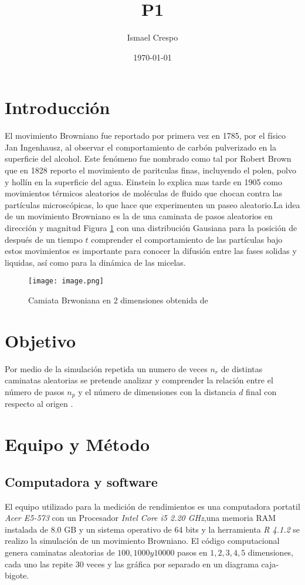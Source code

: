 \documentclass{article}
\title{P1}
\author{Ismael Crespo}
\date{\today}
\begin{document}
\maketitle

\section{Introducción}
El movimiento Browniano fue reportado por primera vez en 1785, por el físico Jan Ingenhausz, al observar el comportamiento de carbón pulverizado en la superficie del alcohol. Este fenómeno fue nombrado como tal por Robert Brown que en 1828 reporto el movimiento de paritculas finas, incluyendo el polen, polvo y hollín en la superficie del agua. Einstein lo explica mas tarde en 1905 como movimientos térmicos aleatorios de moléculas de fluido que chocan contra las partículas microscópicas, lo que hace que experimenten un paseo aleatorio.La idea de un movimiento Browniano es la de una caminata de pasos aleatorios en dirección y magnitud Figura \ref{BM} con una distribución Gausiana para la posición de después de un tiempo $t$ comprender el comportamiento de las partículas bajo estos movimientos es importante para conocer la difusión entre las fases solidas y liquidas, así como para la dinámica de las micelas\citep{K.Joseph_et_al_1996}.
\begin{figure}[h] %
    \centering
    \texttt{[image: image.png]} %
    \caption{Camiata Brwoniana en 2 dimensiones obtenida de \citep{K.Joseph_et_al_1996}}
    \label{BM}
\end{figure}
\section{Objetivo}
Por medio de la simulación repetida un numero de veces $n_r$ de distintas caminatas aleatorias se pretende analizar y comprender la relación entre el número de pasos $n_p$ y el número de dimensiones con la distancia $d$ final con respecto al origen .
\section{Equipo y Método}
\subsection{Computadora y software}
El equipo utilizado para la medición de rendimientos es una computadora portatil \emph{Acer E5-573 } con un Procesador \emph{Intel Core i5 2.20 GHz},una memoria RAM instalada de 8.0 GB y un sistema operativo de 64 bits y la herramienta \emph{R 4.1.2} se realizo la simulación de un movimiento Browniano. El código computacional genera caminatas aleatorias de $100,1000 y 10000$ pasos en $1,2,3,4,5$ dimensiones, cada uno las repite $30$ veces y las gráfica por separado en un diagrama caja-bigote. 
\end{document}
